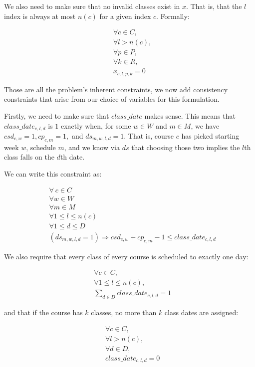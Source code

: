 We also need to make sure that no invalid classes exist in $x$. That is, that the $l$ index is always at most $n(c)$ for a given index $c$. Formally:

\begin{align} \label{eq:noinvalidclasses}
 &\forall c\in C,\\
 &\forall l > n(c),\\
 &\forall p \in P,\\
 &\forall k \in R,\\
 &x_{c, l, p, k} = 0
\end{align}

Those are all the problem's inherent constraints, we now add consistency constraints that arise from our choice of variables for this formulation.

Firstly, we need to make sure that $class\_date$ makes sense. This means that $class\_date_{c, l, d}$ is $1$ exactly when, for some $w \in W$ and $m \in M$, we have $csd_{c, w} = 1, cp_{c, m} = 1,$ and $ds_{m, w, l, d} = 1$. That is, course $c$ has picked starting week $w$, schedule $m$, and we know via $ds$ that choosing those two implies the $l$th class falls on the $d$th date.

We can write this constraint as:

\begin{align}
  &\forall\ c \in C\\
  &\forall w \in W\\
  &\forall m \in M\\
  &\forall 1 \le l \le n(c)\\
  &\forall 1 \le d \le D\\
  &(ds_{m, w, l, d} = 1) \Rightarrow csd_{c, w} + cp_{c, m} - 1 \le class\_date_{c, l, d}
\end{align}

We also require that every class of every course is scheduled to exactly one day:

\begin{align} \label{eq:oneclassdate}
  &\forall c \in C,\\
  &\forall 1 \le l \le n(c),\\
  &\sum_{d \in D} class\_date_{c, l, d} = 1
\end{align}

and that if the course has $k$ classes, no more than $k$ class dates are assigned:

\begin{align} \label{eq:maxclassdates}
  &\forall c \in C,\\
  &\forall l > n(c),\\
  &\forall d \in D,\\
  &class\_date_{c, l, d} = 0
\end{align}

